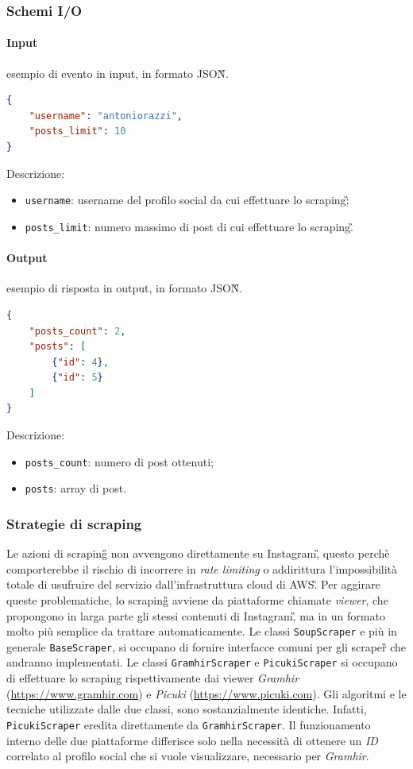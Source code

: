 \subsubsection{Schemi I/O}
\paragraph*{Input} esempio di evento in input, in formato JSON\G{}.
\begin{lstlisting}[language=JSON]
{
    "username": "antoniorazzi",
    "posts_limit": 10
}
\end{lstlisting}
Descrizione:
\begin{itemize}
    \item \verb|username|: username del profilo social da cui effettuare lo scraping\G;
    \item \verb|posts_limit|: numero massimo di post di cui effettuare lo scraping\G. 
\end{itemize}

\paragraph*{Output} esempio di risposta in output, in formato JSON\G{}.
\begin{lstlisting}[language=JSON]
{
    "posts_count": 2,
    "posts": [
        {"id": 4},
        {"id": 5}
    ]
}
\end{lstlisting}
Descrizione:
\begin{itemize}
    \item \verb|posts_count|: numero di post ottenuti;
    \item \verb|posts|: array di post. 
\end{itemize}

\subsubsection{Strategie di scraping}
Le azioni di scraping\G{} non avvengono direttamente su Instagram\G, questo perchè comporterebbe il
rischio di incorrere in \textit{rate limiting} o addirittura l'impossibilità totale di usufruire del servizio dall'infrastruttura cloud di AWS\G.
Per aggirare queste problematiche, lo scraping\G{} avviene da piattaforme chiamate \textit{viewer},
che propongono in larga parte gli stessi contenuti di Instagram\G, ma in un formato molto più semplice da trattare automaticamente.\aCapo
Le classi \verb|SoupScraper| e più in generale \verb|BaseScraper|, si occupano di fornire interfacce comuni per gli scraper\G{} che andranno implementati.
Le classi \verb|GramhirScraper| e \verb|PicukiScraper| si occupano di effettuare lo scraping 
rispettivamente dai viewer \textit{Gramhir} (\url{https://www.gramhir.com}) e \textit{Picuki} (\url{https://www.picuki.com}). Gli algoritmi e le tecniche utilizzate dalle due classi, sono sostanzialmente identiche.
Infatti, \verb|PicukiScraper| eredita direttamente da \verb|GramhirScraper|.
Il funzionamento interno delle due piattaforme differisce solo nella necessità di ottenere un 
\textit{ID} correlato al profilo social che si vuole visualizzare, necessario per \textit{Gramhir}.

